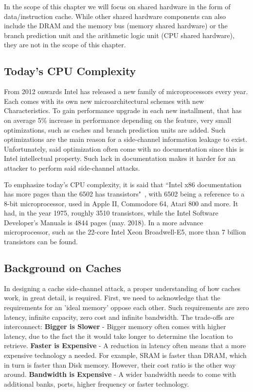 In the scope of this chapter we will focus on shared hardware in the form of
data/instruction cache. While other shared hardware components can also include
the DRAM and the memory bus (memory shared hardware) or the branch prediction
unit and the arithmetic logic unit (CPU shared hardware), they are not in the
scope of this chapter.

\subsection{Today's CPU Complexity}
\label{subsec:todaycpucomplex}
From 2012 onwards Intel has released a new family of microprocessors every year.
Each comes with its own new microarchitectural schemes with new Characteristics.
To gain performance upgrade in each new installment, that has on average 5\%
increase in performance depending on the feature, very small optimizations, such
as caches and branch prediction units are added. Such optimizations are the main
reason for a side-channel information leakage to exist. Unfortunately, said
optimization often come with no documentation since this is Intel intellectual
property. Such lack in documentation makes it harder for an attacker to perform
said side-channel attacks.

To emphasize today's CPU complexity, it is said that ``Intel x86 documentation
has more pages than the 6502 has transistors"~\cite{IntMan}, with 6502 being a
reference to a 8-bit microprocessor, used in Apple II, Commodore 64, Atari 800
and more. It had, in the year 1975, roughly 3510 transistors, while the Intel
Software Developer's Manuals is 4844 pages (may. 2018). In a more advance
microprocessor, such as the 22-core Intel Xeon Broadwell-E5, more than 7 billion
transistors can be found. 

\subsection{Background on Caches}
\label{subsec:backgroundoncaches}
In designing a cache side-channel attack, a proper understanding of how caches
work, in great detail, is required. First, we need to acknowledge that the
requirements for an 'ideal memory' oppose each other. Such requirements are zero
latency, infinite capacity, zero cost and infinite bandwidth. The trade-offs are
interconnect: \textbf{Bigger is Slower} - Bigger memory often comes with higher
latency, due to the fact the it would take longer to determine the location to
retrieve.  \textbf{Faster is Expensive} - A reduction in latency often means
that a more expensive technology a needed. For example, SRAM is faster than
DRAM, which in turn is faster than Disk memory. However, their cost ratio is the
other way around. \textbf{Bandwidth is Expensive} - A wider bandwidth needs to
come with additional banks, ports, higher frequency or faster technology. 

